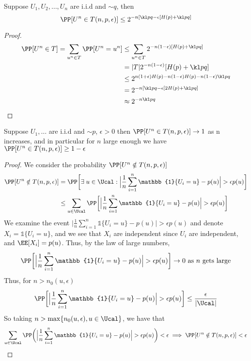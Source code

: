 \begin{corollary}
Suppose $U_1, U_2, \dots, U_n$ are i.i.d and $\sim q$, then
\[ \PP[U^n \in T(n,p,\epsilon)] \leq 2^{-n[\kl pq - \epsilon[H(p) + \kl pq]}\]
\end{corollary}
\begin{proof}
\begin{align*}
    \PP[U^n \in T] = \sum_{u^n \in T} \PP[U^n = u^n] & \leq \sum_{u^n \in T} 2^{-n(1-\epsilon) [H(p) + \kl pq]} \\
    &= |T| 2^{-n(1-\epsilon)} [H(p) + \kl pq] \\
    &\leq 2^{n(1+\epsilon) H(p) - n(1-\epsilon) H(p) - n(1-\epsilon) \kl pq} \\
    &= 2^{-n[\kl pq - \epsilon[2H(p) + \kl pq]} \\
    &\approx 2^{-n \kl pq}
\end{align*}
\end{proof}
\begin{theorem}
Suppose $U_1, \dots$ are i.i.d and $\sim p$, $\epsilon > 0$ then $\PP[U^n \in T(n,p,\epsilon)] \to 1$ as n increases, and in particular for $n$ large enough
we have $\PP[U^n \in T(n,p,\epsilon)] \geq 1 - \epsilon$
\end{theorem}
\begin{proof}
We consider the probability $\PP[U^n \notin T(n,p,\epsilon)]$ 
\begin{align*}
\PP[U^n \notin T(n,p,\epsilon)] &= \PP\bigg[\exists\; u \in \Ucal: \Big|\frac{1}{n} \sum_{i=1}^n \mathbb{1}\{U_i = u\} - p(u)\Big| > \epsilon p(u) \bigg] \\
&\leq \sum_{u \in \Ucal} \PP\bigg[\Big|\frac{1}{n} \sum_{i=1}^n \mathbb{1}\{U_i = u\} - p(u)\Big| > \epsilon p(u) \bigg] 
\end{align*}
We examine the event $\Big|\frac{1}{n} \sum_{i=1}^n \mathbb{1}\{U_i = u\} - p(u)\Big| > \epsilon p(u)$ and denote $X_i = \mathbb{1}\{U_i = u\}$, and we see that $X_i$ are independent since $U_i$ are independent, and $\EE[X_i] = p(u)$. Thus, by the law of large numbers, 
\[\PP\bigg[\Big|\frac{1}{n} \sum_{i=1}^n \mathbb{1}\{U_i = u\} - p(u)\Big| > \epsilon p(u)\bigg] \to 0 \text{ as $n$ gets large}\]
Thus, for $n > n_0(u, \epsilon)$
\[\PP\bigg[\Big|\frac{1}{n} \sum_{i=1}^n \mathbb{1}\{U_i = u\} - p(u)\Big| > \epsilon p(u)\bigg] \leq \frac{\epsilon}{|\Ucal|} \]
So taking $n > \max\{n_0(u, \epsilon), u \in \Ucal\}$, we have that 
\[\sum_{u \in \Ucal} \PP\bigg(\Big|\frac{1}{n} \sum_{i=1}^n \mathbb{1}\{U_i = u\} - p(u)\Big| > \epsilon p(u)\bigg) < \epsilon \implies \PP[U^n \notin T(n,p,\epsilon)] < \epsilon \]
\end{proof}
